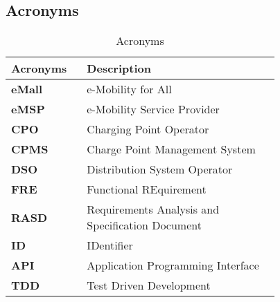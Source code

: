 \subsection{Acronyms} %
\label{subsec:acronyms}
\begin{table}[H]
\centering 
    \begin{tabular}{| p{0.175\linewidth} | p{0.6\linewidth} |}
    \hline
    \rowcolor{bluepoli!40}
     \textbf{Acronyms} & \textbf{Description} \T\B \\
    \hline \hline
    \textbf{eMall} & e-Mobility for All\T\B\\
    \hline
    \textbf{eMSP} & e-Mobility Service Provider\T\B\\
    \hline
    \textbf{CPO} & Charging Point Operator\T\B\\
    \hline
    \textbf{CPMS} & Charge Point Management System\T\B\\
    \hline
    \textbf{DSO} & Distribution System Operator\T\B\\
    \hline
    \textbf{FRE} & Functional REquirement\T\B\\
    \hline    
    \textbf{RASD} & Requirements Analysis and Specification Document\T\B\\
    \hline
    \textbf{ID} & IDentifier\T\B\\
    \hline
    \textbf{API} & Application Programming Interface\T\B\\
    \hline
    \textbf{TDD} & Test Driven Development\T\B\\
    \hline
    \end{tabular}
    \\[10pt]
    \caption{Acronyms} 

\end{table}
